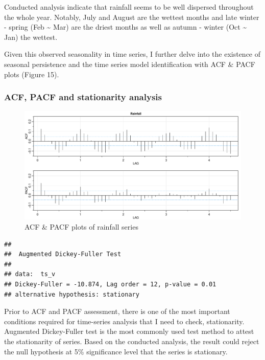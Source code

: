 \documentclass[
  11pt,
]{article}
\begin{document}
Conducted analysis indicate that rainfall seems to be well dispersed
throughout the whole year. Notably, July and August are the wettest
months and late winter - spring (Feb \textasciitilde{} Mar) are the
driest months as well as autumn - winter (Oct \textasciitilde{} Jan) the
wettest.

Given this observed seasonality in time series, I further delve into the
existence of seasonal persistence and the time series model
identification with ACF \& PACF plots (Figure 15).

\newpage

\hypertarget{acf-pacf-and-stationarity-analysis-1}{%
\subsubsection{ACF, PACF and stationarity
analysis}\label{acf-pacf-and-stationarity-analysis-1}}

\begin{figure}
\centering
\includegraphics{ST422_files/figure-latex/unnamed-chunk-22-1.pdf}
\caption{ACF \& PACF plots of rainfall series}
\end{figure}

\begin{verbatim}
## 
##  Augmented Dickey-Fuller Test
## 
## data:  ts_v
## Dickey-Fuller = -10.874, Lag order = 12, p-value = 0.01
## alternative hypothesis: stationary
\end{verbatim}

Prior to ACF and PACF assessment, there is one of the most important
conditions required for time-series analysis that I need to check,
stationarity. Augmented Dickey-Fuller test is the most commonly used
test method to attest the stationarity of series. Based on the conducted
analysis, the result could reject the null hypothesis at 5\%
significance level that the series is stationary.
\end{document}
